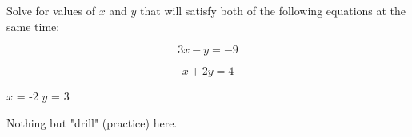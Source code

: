 

Solve for values of $x$ and $y$ that will satisfy both of the following equations at the same time:

$$3x - y = -9$$

$$x + 2y = 4$$







$x$ = -2 \hskip 50pt $y$ = 3







Nothing but "drill" (practice) here.




